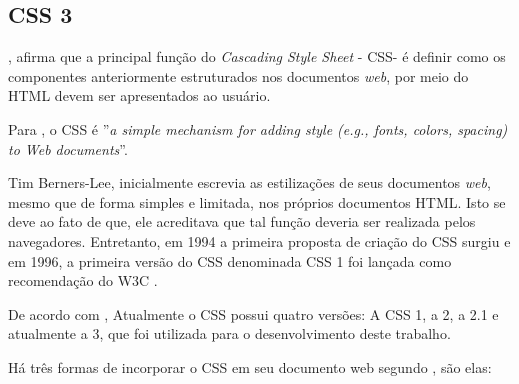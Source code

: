 \subsection{CSS 3}

, afirma que a principal função do \textit{Cascading Style Sheet} - CSS\footnotemark[28] - é definir como os componentes anteriormente estruturados nos documentos \textit{web}, por meio do HTML devem ser apresentados ao usuário.


Para , o CSS é ''\textit{a simple mechanism for adding style (e.g., fonts, colors, spacing) to Web documents}\footnotemark[29]''.


Tim Berners-Lee, inicialmente escrevia as estilizações de seus documentos \textit{web}, mesmo que de forma simples e limitada, nos próprios documentos HTML. Isto se deve ao fato de que, ele acreditava que tal função deveria ser realizada pelos navegadores. Entretanto, em 1994 a primeira proposta de criação do CSS surgiu e em 1996, a primeira versão do CSS denominada CSS 1 foi lançada como recomendação do W3C \cite{silva_css_3}.

De acordo com , Atualmente o CSS possui quatro versões: A CSS 1, a 2, a 2.1 e atualmente a 3, que foi utilizada para o desenvolvimento deste trabalho.

Há três formas de incorporar o CSS em seu documento web segundo \cite{silva_css_3}, são elas: 


